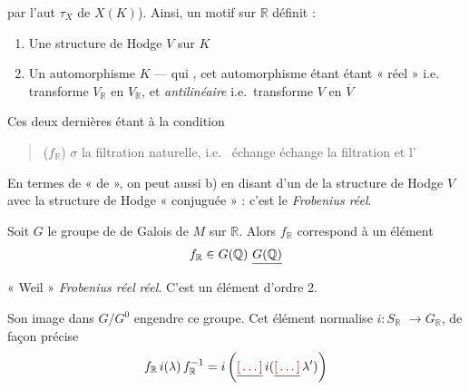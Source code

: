 \documentclass[11pt,a4paper]{article}
\begin{document}

 par l'aut  $\tau_{X}$ de
$X(K)$). Ainsi, un motif sur $\mathbb{R}$ définit \ill{} :

\begin{enumerate}
  \item Une structure de  Hodge  $V$ sur $K$
  \item Un automorphisme \struck{\ill{}}  \ill{}
         \ill{} $K$ --- qui  \ill{}, cet
        automorphisme étant étant « réel » i.e.\  transforme
        $V_{\mathbb{R}}$ en $V_{\mathbb{R}}$, et \ill{} \emph{antilinéaire}
         i.e.\ transforme $V$ en $\overline{V}$
\end{enumerate}

\struck{\ill{}} Ces deux dernières étant 
 à la condition

\begin{quote}
($f_{\mathbb{R}}$) \quad $\sigma$ \ill{}  la filtration
naturelle, i.e.\  échange échange  la
filtration  et l'
\end{quote}

En termes de «   de  »,
on peut \struck{\ill{}}  aussi b) en disant 
 \ill{} d'un  de la structure de
 Hodge $V$ avec la structure de Hodge \struck{\ill{}}
« conjuguée »  : c'est le \emph{Frobenius réel}.

Soit $G$ le groupe de \ill{} de Galois  de $M$ sur
$\mathbb{R}$. Alors $f_{\mathbb{R}}$ correspond à \ill{} un élément
\[
  f_{\mathbb{R}} \in G(\mathbb{Q}) \ \struck{G(\mathbb{Q})}
\]
« Weil » \emph{Frobenius réel} \emph{réel}. C'est un élément d'ordre 2.

Son image dans $G/G^{0}$  engendre ce groupe. Cet élément
normalise $i : S_{\mathbb{R}}$ \struck{$\to$} 
$\longrightarrow G_{\mathbb{R}}$, de façon précise
\[
  f_{\mathbb{R}}\, i(\lambda)\, f_{\mathbb{R}}^{-1} = i\left(\struck{\ill{}}\, i(\struck{\ill{}}\, \lambda')\right)
\]
\end{document}

